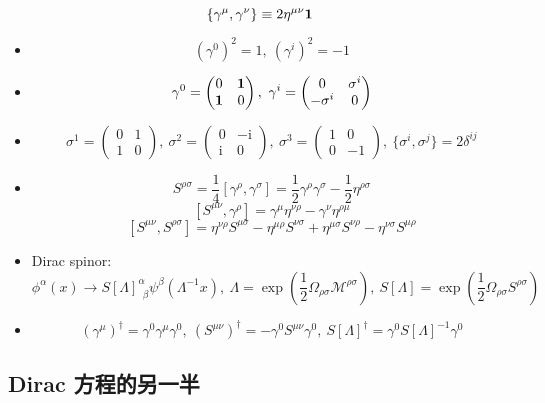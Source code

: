 \documentclass{article}
\begin{document}
$$
\{\gamma^{\mu},\gamma^{\nu}\}\equiv2\eta^{\mu\nu}\bf{1}
$$

\begin{itemize}
\item $$(\gamma^0)^2=1,\ (\gamma^i)^2=-1$$
\item $$
  \gamma^0=
  \begin{pmatrix}
    0 & \bf{1} \\ \bf{1} & 0
  \end{pmatrix},\ \gamma^i=
  \begin{pmatrix}
    0 & \sigma^i \\ -\sigma^i & 0
  \end{pmatrix}
  $$
\item $$
  \sigma^1=
  \begin{pmatrix}
    0 & 1 \\ 1 & 0
  \end{pmatrix},\ \sigma^2=
  \begin{pmatrix}
    0 & -\mathrm{i} \\ \mathrm{i} & 0
  \end{pmatrix},\ \sigma^3=
  \begin{pmatrix}
    1 & 0 \\ 0 & -1
  \end{pmatrix},\ \{\sigma^i,\sigma^j\}=2\delta^{ij}
  $$
\item $$S^{\rho\sigma}=\frac{1}{4}[\gamma^{\rho},\gamma^{\sigma}]=\frac{1}{2}\gamma^{\rho}\gamma^{\sigma}-\frac{1}{2}\eta^{\rho\sigma}$$ $$[S^{\mu\nu},\gamma^{\rho}]=\gamma^{\mu}\eta^{\nu\rho}-\gamma^{\nu}\eta^{\rho\mu}$$ $$[S^{\mu\nu},S^{\rho\sigma}]=\eta^{\nu\rho}S^{\mu\sigma}-\eta^{\mu\rho}S^{\nu\sigma}+\eta^{\mu\sigma}S^{\nu\rho}-\eta^{\nu\sigma}S^{\mu\rho}$$
\item Dirac spinor: $$\phi^\alpha(x)\to S[\Lambda]^{\alpha}_{\ \ \beta}\psi^{\beta}(\Lambda^{-1}x),\ \Lambda=\exp\left(\frac{1}{2}\Omega_{\rho\sigma}\mathcal{M}^{\rho\sigma}\right),\ S[\Lambda]=\exp\left(\frac{1}{2}\Omega_{\rho\sigma}S^{\rho\sigma}\right)$$
\item $$\left(\gamma^{\mu}\right)^{\dagger}=\gamma^0\gamma^\mu\gamma^0,\ \left(S^{\mu\nu}\right)^{\dagger}=-\gamma^0S^{\mu\nu}\gamma^0,\ S[\Lambda]^{\dagger}=\gamma^0S[\Lambda]^{-1}\gamma^0$$
\end{itemize}

\subsection{Dirac 方程的另一半}
\end{document}
